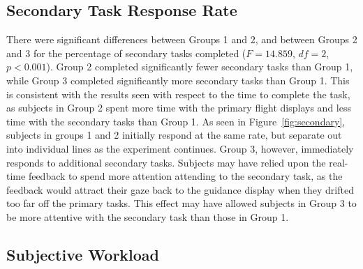 \documentclass[]{aiaa-tc}%
\begin{document}

\subsection{Secondary Task Response Rate}
There were significant differences between Groups 1 and 2, and between Groups 2 and 3 for the percentage of secondary tasks completed ($F=14.859$, $df = 2$, $p < 0.001$).%
Group 2 completed significantly fewer secondary tasks than Group 1, while Group 3 completed significantly more secondary tasks than Group 1. This is consistent with the results seen with respect to the time to complete the task, as subjects in Group 2 spent more time with the primary flight displays and less time with the secondary tasks than Group 1. As seen in Figure~\ref{fig:secondary}, subjects in groups 1 and 2 initially respond at the same rate, but separate out into individual lines as the experiment continues. Group 3, however, immediately responds to additional secondary tasks. Subjects may have relied upon the real-time feedback to spend more attention attending to the secondary task, as the feedback would attract their gaze back to the guidance display when they drifted too far off the primary tasks. This effect may have allowed subjects in Group 3 to be more attentive with the secondary task than those in Group 1.

\subsection{Subjective Workload}
\end{document}
